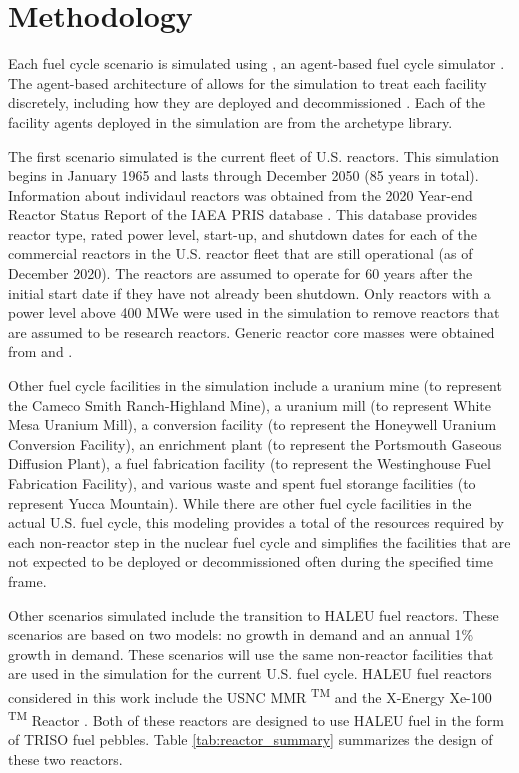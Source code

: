\section{Methodology}

Each fuel cycle scenario is simulated using \Cyclus, an 
agent-based fuel cycle simulator \cite{huff_fundamental_2016}. 
The agent-based architecture of \Cyclus allows for the simulation to treat
each facility discretely, including how they are deployed and 
decommissioned \cite{huff_fundamental_2016}. Each of the facility agents 
deployed in the simulation are from the \Cycamore archetype library. 

The first scenario simulated is the current fleet of U.S. reactors. This 
simulation begins in January 1965 and lasts through December 2050 (85 
years in total). Information about individaul reactors was obtained 
from the 2020 Year-end Reactor Status Report of the \gls{IAEA} \gls{PRIS} 
database \cite{noauthor_power_1989}. 
This database provides reactor type, rated power level, start-up, and 
shutdown dates for each of the commercial reactors in the U.S. reactor
fleet
that are still operational (as of December 2020). The reactors are assumed 
to operate for 60 years after the 
initial start date if they have not already been shutdown. Only reactors
with a power level above 400 MWe were 
used in the simulation to remove reactors that are assumed to be research 
reactors. Generic reactor core masses were obtained from 
\cite{todreas_nuclear_2012} and \cite{cacuci_handbook_2010}. 

Other fuel cycle facilities in the simulation include a uranium mine (to 
represent the Cameco Smith Ranch-Highland Mine), a uranium mill (to 
represent White Mesa Uranium Mill), a conversion facility (to represent 
the Honeywell Uranium Conversion Facility), an enrichment plant (to represent 
the Portsmouth Gaseous Diffusion Plant), a fuel fabrication facility (to 
represent the Westinghouse Fuel Fabrication Facility), and various waste and 
spent fuel storange facilities (to represent Yucca Mountain). While there
are other fuel cycle facilities in the actual U.S. fuel cycle, this 
modeling provides a total of the resources required 
by each non-reactor step in the nuclear fuel cycle and simplifies the 
facilities that are not expected to be deployed or decommissioned often 
during the specified time frame. 

Other scenarios simulated include the transition to \gls{HALEU} fuel 
reactors. These scenarios are based on two models: no growth in demand 
and an annual 1\% growth in demand. These scenarios will use the same 
non-reactor facilities that are used in the simulation for the current 
U.S. fuel cycle. \gls{HALEU} fuel reactors 
considered in this work include the \gls{USNC} \gls{MMR} \textsuperscript{TM}
\cite{mitchell_usnc_2020} and the X-Energy Xe-100 \textsuperscript{TM} 
Reactor \cite{harlan_x-energy_2018}\cite{hussain_advances_2018}. Both of 
these reactors are designed 
to use \gls{HALEU} fuel in the form of \gls{TRISO} fuel pebbles. Table 
\ref{tab:reactor_summary} summarizes the design of these two reactors.

